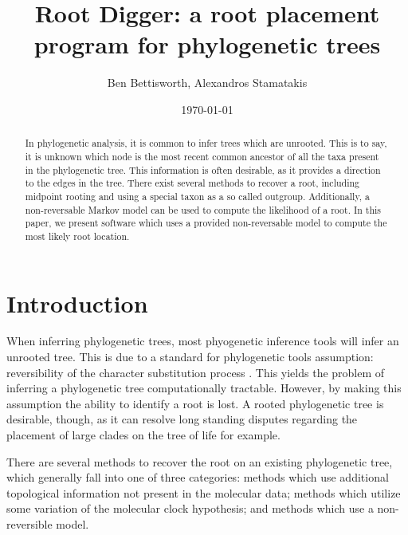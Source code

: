 \documentclass{article}
\title{Root Digger: a root placement program for phylogenetic trees}
\author{Ben Bettisworth, Alexandros Stamatakis}
\date{\today}
\begin{document}
\begin{abstract}
  In phylogenetic analysis, it is common to infer trees which are unrooted.
  This is to say, it is unknown which node is the most recent common ancestor of
  all the taxa present in the phylogenetic tree.
  This information is often desirable, as it provides a direction to the edges in
  the tree.
  There exist several methods to recover a root, including midpoint rooting and
  using a special taxon as a so called outgroup.
  Additionally, a non-reversable Markov model can be used to compute the
  likelihood of a root.
  In this paper, we present software which uses a provided non-reversable model
  to compute the most likely root location.
\end{abstract}

\maketitle


\section{Introduction}


When inferring phylogenetic trees, most phyogenetic inference tools
\cite{nguyen_iq-tree:_2015, stamatakis_raxml_2014, minh_iq-tree_2019} will infer
an unrooted tree. This is due to a standard for phylogenetic tools assumption:
reversibility of the character substitution process
\cite{felsenstein_evolutionary_1981}.  This yields the problem of inferring a
phylogenetic tree computationally tractable.  However, by making this assumption
the ability to identify a root is lost. A rooted phylogenetic tree is desirable,
though, as it can resolve long standing disputes regarding the placement of
large clades on the tree of life \cite{dunn_animal_2014} for example.

There are several methods to recover the root on an existing phylogenetic tree,
which generally fall into one of three categories: methods which use additional
topological information not present in the molecular data; methods which
utilize some variation of the molecular clock hypothesis; and methods which use
a non-reversible model.
\doublespace
\end{document}
